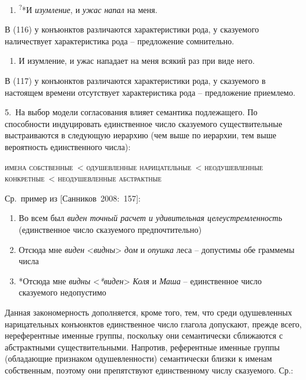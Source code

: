 \begin{enumerate}
\def\labelenumi{(\arabic{enumi})}
\setcounter{enumi}{115}
\item
  \textsuperscript{?}*И \emph{изумление}, и \emph{ужас} \emph{напал} на
  меня.
\end{enumerate}

В (116) у конъюнктов различаются характеристики рода, у сказуемого
наличествует характеристика рода -- предложение сомнительно.

\begin{enumerate}
\def\labelenumi{(\arabic{enumi})}
\setcounter{enumi}{116}
\item
  И изумление, и ужас нападает на меня всякий раз при виде него.
\end{enumerate}

В (117) у конъюнктов различаются характеристики рода, у сказуемого в
настоящем времени отсутствует характеристика рода -- предложение
приемлемо.

5.~На выбор модели согласования влияет семантика подлежащего. По
способности индуцировать единственное число сказуемого существительные
выстраиваются в следующую иерархию (чем выше по иерархии, тем выше
вероятность единственного числа):

\textsc{имена собственные~\textless{} одушевленные
нарицательные~\textless{} неодушевленные конкретные~\textless{}
неодушевленные абстрактные}

Ср.~пример из {[}Санников~2008:~157{]}:

\begin{enumerate}
\def\labelenumi{(\arabic{enumi})}
\setcounter{enumi}{117}
\item
  Во всем был \emph{виден точный расчет и удивительная
  целеустремленность} (единственное число сказуемого предпочтительно)
\item
  Отсюда мне \emph{виден} \textless{}\emph{видны}\textgreater{}
  \emph{дом} и \emph{опушка} леса -- допустимы обе граммемы числа
\item
  *Отсюда мне \emph{видны} \textless{}\emph{*виден}\textgreater{}
  \emph{Коля} и \emph{Маша} -- единственное число сказуемого недопустимо
\end{enumerate}

Данная закономерность дополняется, кроме того, тем, что среди
одушевленных нарицательных конъюнктов единственное число глагола
допускают, прежде всего, нереферентные именные группы, поскольку они
семантически сближаются с абстрактными существительными. Напротив,
референтные именные группы (обладающие признаком одушевленности)
семантически близки к именам собственным, поэтому они препятствуют
единственному числу сказуемого. Ср.:

